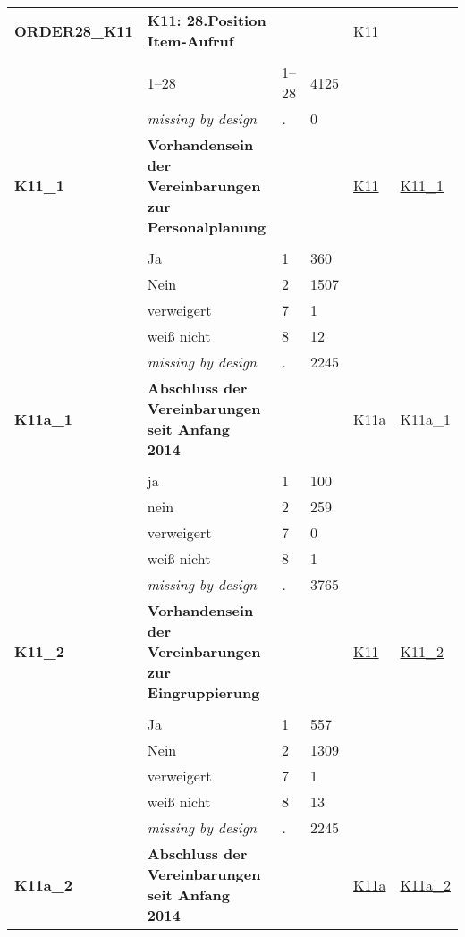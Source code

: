 \begin{longtable}{| L{2.45cm} | L{6cm} | C{1.5cm} | R{1cm} | C{2.25cm} | C{2.25cm} |}
   \midrule
\textbf{ORDER28\_K11}\label{var:ORDER28:K11} & \textbf{K11: 28.Position Item-Aufruf} &  &  & \hyperref[K11]{K11} & \hyperref[var:suf:]{} \\ 
   &  &  &  &  &  \\ 
   & 1--28 & 1--28 & 4125 &  &  \\ 
   & \textit{missing by design} & \textit{.} & 0 &  &  \\ 
   \midrule
\textbf{K11\_1}\label{var:K11:1} & \textbf{Vorhandensein der Vereinbarungen zur Personalplanung} &  &  & \hyperref[K11]{K11} & \hyperref[var:suf:K11:1]{K11\_1} \\ 
   &  &  &  &  &  \\ 
   & Ja & 1 & 360 &  &  \\ 
   & Nein & 2 & 1507 &  &  \\ 
   & verweigert & 7 & 1 &  &  \\ 
   & weiß nicht & 8 & 12 &  &  \\ 
   & \textit{missing by design} & \textit{.} & 2245 &  &  \\ 
   \midrule
\textbf{K11a\_1}\label{var:K11a:1} & \textbf{Abschluss der Vereinbarungen seit Anfang 2014} &  &  & \hyperref[K11a]{K11a} & \hyperref[var:suf:K11a:1]{K11a\_1} \\ 
   &  &  &  &  &  \\ 
   & ja & 1 & 100 &  &  \\ 
   & nein & 2 & 259 &  &  \\ 
   & verweigert & 7 & 0 &  &  \\ 
   & weiß nicht & 8 & 1 &  &  \\ 
   & \textit{missing by design} & \textit{.} & 3765 &  &  \\ 
   \midrule
\textbf{K11\_2}\label{var:K11:2} & \textbf{Vorhandensein der Vereinbarungen zur Eingruppierung} &  &  & \hyperref[K11]{K11} & \hyperref[var:suf:K11:2]{K11\_2} \\ 
   &  &  &  &  &  \\ 
   & Ja & 1 & 557 &  &  \\ 
   & Nein & 2 & 1309 &  &  \\ 
   & verweigert & 7 & 1 &  &  \\ 
   & weiß nicht & 8 & 13 &  &  \\ 
   & \textit{missing by design} & \textit{.} & 2245 &  &  \\ 
   \midrule
\textbf{K11a\_2}\label{var:K11a:2} & \textbf{Abschluss der Vereinbarungen seit Anfang 2014} &  &  & \hyperref[K11a]{K11a} & \hyperref[var:suf:K11a:2]{K11a\_2} \\ 

\end{longtable}
